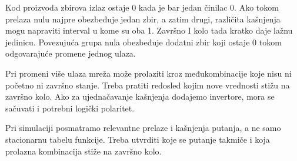 
Kod proizvoda zbirova izlaz ostaje 0 kada je bar jedan činilac 0. Ako tokom prelaza nulu najpre obezbeđuje jedan zbir, a zatim drugi, različita kašnjenja mogu napraviti interval u kome su oba 1. Završno I kolo tada kratko daje lažnu jedinicu. Povezujuća grupa nula obezbeđuje dodatni zbir koji ostaje 0 tokom odgovarajuće promene jednog ulaza.

Pri promeni više ulaza mreža može prolaziti kroz međukombinacije koje nisu ni početno ni završno stanje. Treba pratiti redosled kojim nove vrednosti stižu na završno kolo. Ako za ujednačavanje kašnjenja dodajemo invertore, mora se sačuvati i potrebni logički polaritet.

Pri simulaciji posmatramo relevantne prelaze i kašnjenja putanja, a ne samo stacionarnu tabelu funkcije. Treba utvrditi koje se putanje takmiče i koja prolazna kombinacija stiže na završno kolo.
